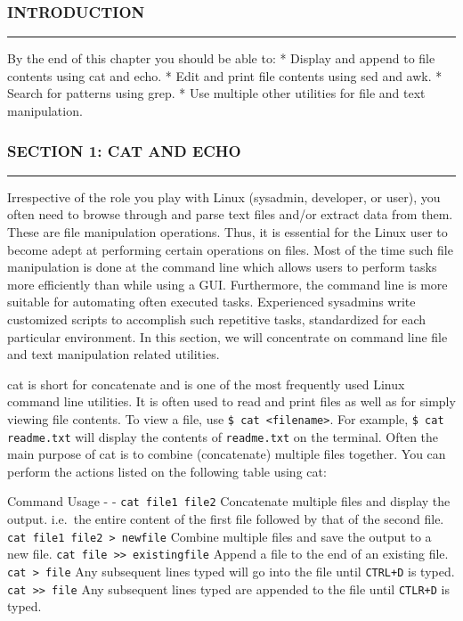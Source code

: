 \subsubsection{INTRODUCTION}\label{introduction-12}

\begin{center}\rule{3in}{0.4pt}\end{center}

By the end of this chapter you should be able to: * Display and append
to file contents using cat and echo. * Edit and print file contents
using sed and awk. * Search for patterns using grep. * Use multiple
other utilities for file and text manipulation.

\subsubsection{SECTION 1: CAT AND ECHO}\label{section-1-cat-and-echo}

\begin{center}\rule{3in}{0.4pt}\end{center}

Irrespective of the role you play with Linux (sysadmin, developer, or
user), you often need to browse through and parse text files and/or
extract data from them. These are file manipulation operations. Thus, it
is essential for the Linux user to become adept at performing certain
operations on files. Most of the time such file manipulation is done at
the command line which allows users to perform tasks more efficiently
than while using a GUI. Furthermore, the command line is more suitable
for automating often executed tasks. Experienced sysadmins write
customized scripts to accomplish such repetitive tasks, standardized for
each particular environment. In this section, we will concentrate on
command line file and text manipulation related utilities.

cat is short for concatenate and is one of the most frequently used
Linux command line utilities. It is often used to read and print files
as well as for simply viewing file contents. To view a file, use
\texttt{\$ cat \textless{}filename\textgreater{}}. For example,
\texttt{\$ cat readme.txt} will display the contents of
\texttt{readme.txt} on the terminal. Often the main purpose of cat is to
combine (concatenate) multiple files together. You can perform the
actions listed on the following table using cat:

Command \textbar{} Usage - \textbar{} - \texttt{cat file1 file2}
\textbar{} Concatenate multiple files and display the output. i.e.~the
entire content of the first file followed by that of the second file.
\texttt{cat file1 file2 \textgreater{} newfile} \textbar{} Combine
multiple files and save the output to a new file.
\texttt{cat file \textgreater{}\textgreater{} existingfile} \textbar{}
Append a file to the end of an existing file.
\texttt{cat \textgreater{} file} \textbar{} Any subsequent lines typed
will go into the file until \texttt{CTRL+D} is typed.
\texttt{cat \textgreater{}\textgreater{} file} \textbar{} Any subsequent
lines typed are appended to the file until \texttt{CTLR+D} is typed.

